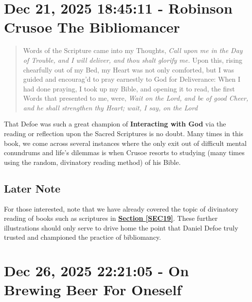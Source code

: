\documentclass[a4paper]{article}
\begin{document}
\section{Dec 21, 2025 18:45:11 - Robinson Crusoe The Bibliomancer}
\label{SEC43}


\noindent
\begin{minipage}{1\textwidth}
\vspace{1em}
\begin{quotation}
{\ttfamily

Words of the Scripture came into my Thoughts, \textit{Call upon me in the Day of Trouble, and I will deliver, and thou shalt glorify me.} Upon this, rising chearfully out of my Bed, my Heart was not only comforted, but I was guided and encourag’d to pray earnestly to God for Deliverance: When I had done praying, I took up my Bible, and opening it to read, the first Words that presented to me, were, \textit{Wait on the Lord, and be of good Cheer, and he shall strengthen thy Heart; wait, I say, on the Lord}


}
\end{quotation}
\vspace{1em}
\end{minipage}



That Defoe was such a great champion of \textbf{Interacting with God} via the reading or reflection upon the Sacred Scriptures is no doubt. Many times in this book, we come across several instances where the only exit out of difficult mental conundrums and life's dilemmas is when Crusoe resorts to studying (many times using the random, divinatory reading method) of his Bible. 

\subsection{Later Note}

For those interested, note that we have already covered the topic of divinatory reading of books such as scriptures in \textbf{\hyperref[SEC19]{Section \ref{SEC19}}}. These further illustrations should only serve to drive home the point that Daniel Defoe truly trusted and championed the practice of bibliomancy.







\section{Dec 26, 2025 22:21:05 - On Brewing Beer For Oneself}
\label{SEC44}
\end{document}
